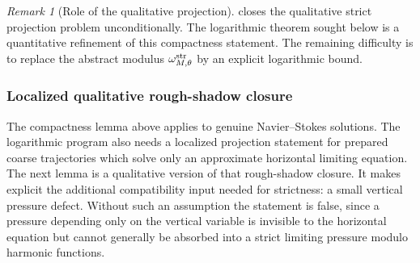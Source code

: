 \documentclass[11pt]{article}
\numberwithin{equation}{section}
\theoremstyle{plain}
\theoremstyle{definition}
\theoremstyle{remark}
\newtheorem{remark}{Remark}[section]
\begin{document}
\begin{remark}[Role of the qualitative projection]
 closes the qualitative strict projection problem unconditionally.  The logarithmic theorem sought below is a quantitative refinement of this compactness statement.  The remaining difficulty is to replace the abstract modulus \(\omega^{\rm str}_{M,\theta}\) by an explicit logarithmic bound.
\end{remark}


\subsubsection{Localized qualitative rough-shadow closure}

The compactness lemma above applies to genuine Navier--Stokes solutions.  The logarithmic program also needs a localized projection statement for prepared coarse trajectories which solve only an approximate horizontal limiting equation.  The next lemma is a qualitative version of that rough-shadow closure.  It makes explicit the additional compatibility input needed for strictness: a small vertical pressure defect.  Without such an assumption the statement is false, since a pressure depending only on the vertical variable is invisible to the horizontal equation but cannot generally be absorbed into a strict limiting pressure modulo harmonic functions.
\end{document}
